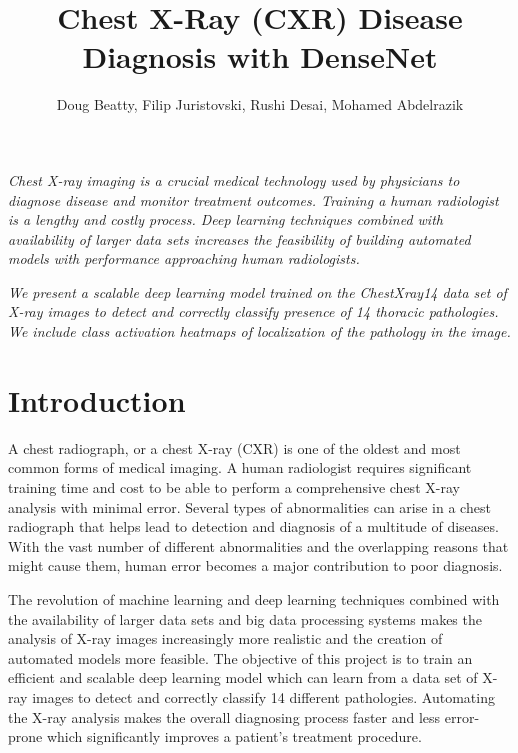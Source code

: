 \documentclass{amia}
\begin{document}
\title{Chest X-Ray (CXR) Disease Diagnosis with DenseNet}

\author{Doug Beatty, Filip Juristovski, Rushi Desai, Mohamed Abdelrazik}


\maketitle


\textit{Chest X-ray imaging \cite{ref1} is a crucial medical technology used by physicians to diagnose disease and monitor treatment outcomes. Training a human radiologist is a lengthy and costly process. Deep learning techniques combined with availability of larger data sets increases the feasibility of building automated models with performance approaching human radiologists.}

\textit{We present a scalable deep learning model trained on the ChestXray14 \cite{ref7} data set of X-ray images to detect and correctly classify presence of 14 thoracic pathologies. We include class activation heatmaps of localization of the pathology in the image.}

\section*{Introduction}
A chest radiograph\cite{ref1}, or a chest X-ray (CXR) is one of the oldest and most common forms of medical imaging. A human radiologist requires significant training time and cost to be able to perform a comprehensive chest X-ray analysis with minimal error. Several types of abnormalities can arise in a chest radiograph that helps lead to detection and diagnosis of a multitude of diseases. With the vast number of different abnormalities and the overlapping reasons that might cause them, human error becomes a major contribution to poor diagnosis.

The revolution of machine learning and deep learning techniques combined with the availability of larger data sets\cite{ref2} and big data processing systems\cite{ref3} makes the analysis of X-ray images increasingly more realistic and the creation of automated models more feasible. The objective of this project is to train an efficient and scalable deep learning model which can learn from a data set of X-ray images to detect and correctly classify 14 different pathologies. Automating the X-ray analysis makes the overall diagnosing process faster and less error-prone which significantly improves a patient’s treatment procedure.
\end{document}
